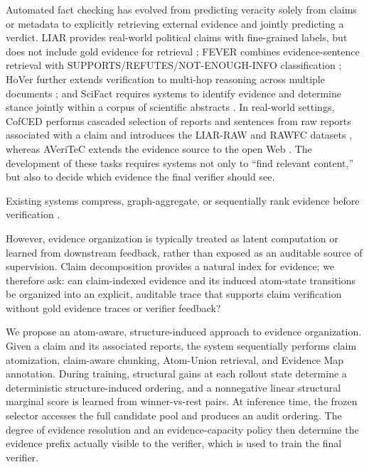 \documentclass[letterpaper]{article}
\begin{document}
Automated fact checking has evolved from predicting veracity solely from claims or metadata to explicitly retrieving external evidence and jointly predicting a verdict. LIAR provides real-world political claims with fine-grained labels, but does not include gold evidence for retrieval \citep{Wang2017LIAR}; FEVER combines evidence-sentence retrieval with SUPPORTS/REFUTES/NOT-ENOUGH-INFO classification \citep{Thorne2018FEVER}; HoVer further extends verification to multi-hop reasoning across multiple documents \citep{Jiang2020HoVer}; and SciFact requires systems to identify evidence and determine stance jointly within a corpus of scientific abstracts \citep{Wadden2020SciFact}. In real-world settings, CofCED performs cascaded selection of reports and sentences from raw reports associated with a claim and introduces the LIAR-RAW and RAWFC datasets \citep{Yang2022CofCED}, whereas AVeriTeC extends the evidence source to the open Web \citep{Schlichtkrull2023AVeriTeC}. The development of these tasks requires systems not only to ``find relevant content,'' but also to decide which evidence the final verifier should see.

Existing systems compress, graph-aggregate, or sequentially rank
evidence before verification
\citep{Yang2022CofCED,Zhou2019GEAR,Aly2022NaturalLogic,
Zhang2024FFRR}.


However, evidence organization is typically treated as latent
computation or learned from downstream feedback, rather than exposed
as an auditable source of supervision. Claim decomposition provides a
natural index for evidence; we therefore ask: can claim-indexed evidence and its induced atom-state transitions be organized into an explicit, auditable trace that supports claim verification without gold evidence traces or verifier feedback?

We propose an atom-aware, structure-induced approach to evidence organization. Given a claim and its associated reports, the system sequentially performs claim atomization, claim-aware chunking, Atom-Union retrieval, and Evidence Map annotation. During training, structural gains at each rollout state determine a deterministic structure-induced ordering, and a nonnegative linear structural marginal score is learned from winner-vs-rest pairs. At inference time, the frozen selector accesses the full candidate pool and produces an audit ordering. The degree of evidence resolution and an evidence-capacity policy then determine the evidence prefix actually visible to the verifier, which is used to train the final verifier.
\end{document}
